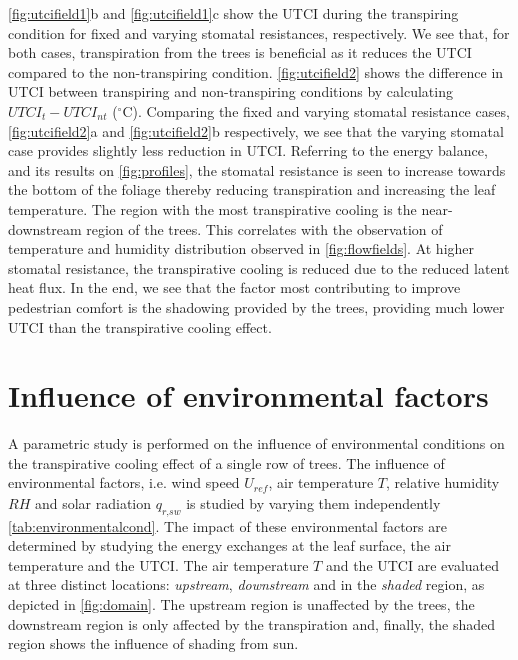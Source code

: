 \cref{fig:utcifield1}b and \cref{fig:utcifield1}c show the UTCI during the transpiring condition for fixed and varying stomatal resistances, respectively. We see that, for both cases, transpiration from the trees is beneficial as it reduces the UTCI compared to the non-transpiring condition. \cref{fig:utcifield2} shows the difference in UTCI between transpiring and non-transpiring conditions by calculating $\textit{UTCI}_t-\textit{UTCI}_{\textit{nt}}$ ($^{\circ}$C). Comparing the fixed and varying stomatal resistance cases, \cref{fig:utcifield2}a and \cref{fig:utcifield2}b respectively, we see that the varying stomatal case provides slightly less reduction in UTCI. Referring to the energy balance, and its results on \cref{fig:profiles}, the stomatal resistance is seen to increase towards the bottom of the foliage thereby reducing transpiration and increasing the leaf temperature. The region with the most transpirative cooling is the near-downstream region of the trees. This correlates with the observation of temperature and humidity distribution observed in \cref{fig:flowfields}. At higher stomatal resistance, the transpirative cooling is reduced due to the reduced latent heat flux. In the end, we see that the factor most contributing to improve pedestrian comfort is the shadowing provided by the trees, providing much lower UTCI than the transpirative cooling effect. 

\section{Influence of environmental factors}

A parametric study is performed on the influence of environmental conditions on the transpirative cooling effect of a single row of trees. The influence of environmental factors, i.e. wind speed $U_{\textit{ref}}$, air temperature $T$, relative humidity $\textit{RH}$ and solar radiation $q_{\textit{r,sw}}$ is studied by varying them independently \cref{tab:environmentalcond}. The impact of these environmental factors are determined by studying the energy exchanges at the leaf surface, the air temperature and the UTCI. The air temperature $T$ and the UTCI are evaluated at three distinct locations: \textit{upstream}, \textit{downstream} and in the \textit{shaded} region, as depicted in \cref{fig:domain}. The upstream region is unaffected by the trees, the downstream region is only affected by the transpiration and, finally, the shaded region shows the influence of shading from sun. 


